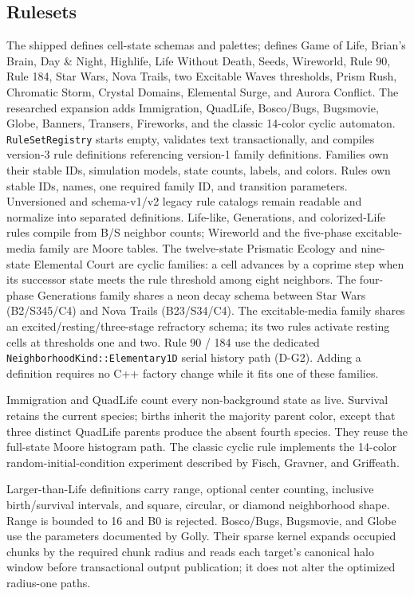 \subsection{Rulesets}
The shipped  defines cell-state schemas and palettes;
 defines Game of Life, Brian's Brain, Day
\& Night, Highlife, Life Without Death, Seeds, Wireworld, Rule 90, Rule 184,
Star Wars, Nova Trails, two Excitable Waves thresholds, Prism Rush, Chromatic
Storm, Crystal Domains, Elemental Surge, and Aurora Conflict.
The researched expansion adds Immigration, QuadLife, Bosco/Bugs, Bugsmovie,
Globe, Banners, Transers, Fireworks, and the classic 14-color cyclic automaton.
\texttt{RuleSetRegistry} starts empty, validates text transactionally, and
compiles version-3 rule definitions referencing version-1 family definitions.
Families own their stable IDs, simulation models, state counts, labels, and
colors. Rules own stable IDs, names, one required family ID, and transition
parameters. Unversioned and schema-v1/v2 legacy rule catalogs remain readable
and normalize into separated definitions. Life-like, Generations, and
colorized-Life rules
compile from B/S neighbor counts; Wireworld and the five-phase excitable-media
family are Moore tables. The twelve-state Prismatic Ecology and nine-state
Elemental Court are cyclic families: a cell advances by a coprime step when its
successor state meets the rule threshold among eight neighbors. The four-phase Generations family shares a neon decay
schema between Star Wars (B2/S345/C4) and Nova Trails (B23/S34/C4). The
excitable-media family shares an excited/resting/three-stage refractory schema;
its two rules activate resting cells at thresholds one and two. Rule 90 / 184 use the dedicated
\texttt{NeighborhoodKind::}\allowbreak\texttt{Elementary1D} serial history
path (D-G2). Adding a definition requires no C++ factory change while it fits
one of these families.

Immigration and QuadLife count every non-background state as live. Survival
retains the current species; births inherit the majority parent color, except
that three distinct QuadLife parents produce the absent fourth species. They
reuse the full-state Moore histogram path. The classic cyclic rule implements
the 14-color random-initial-condition experiment described by Fisch, Gravner,
and Griffeath.

Larger-than-Life definitions carry range, optional center counting, inclusive
birth/survival intervals, and square, circular, or diamond neighborhood shape.
Range is bounded to 16 and B0 is rejected. Bosco/Bugs, Bugsmovie, and Globe use
the parameters documented by Golly. Their sparse kernel expands occupied
chunks by the required chunk radius and reads each target's canonical halo
window before transactional output publication; it does not alter the
optimized radius-one paths.

